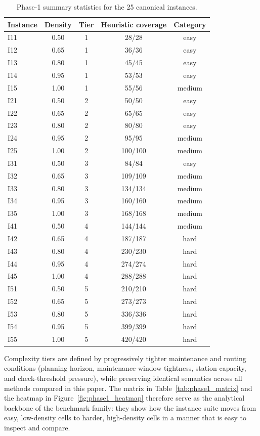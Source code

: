 \begin{table}[t]
\centering\small
\caption{Phase-1 summary statistics for the 25 canonical instances.}
\label{tab:phase1_summary}
\begin{tabular}{lcccc}
\toprule
Instance & Density & Tier & Heuristic coverage & Category \\
\midrule
I11 & 0.50 & 1 & 28/28 & easy \\
I12 & 0.65 & 1 & 36/36 & easy \\
I13 & 0.80 & 1 & 45/45 & easy \\
I14 & 0.95 & 1 & 53/53 & easy \\
I15 & 1.00 & 1 & 55/56 & medium \\
I21 & 0.50 & 2 & 50/50 & easy \\
I22 & 0.65 & 2 & 65/65 & easy \\
I23 & 0.80 & 2 & 80/80 & easy \\
I24 & 0.95 & 2 & 95/95 & medium \\
I25 & 1.00 & 2 & 100/100 & medium \\
I31 & 0.50 & 3 & 84/84 & easy \\
I32 & 0.65 & 3 & 109/109 & medium \\
I33 & 0.80 & 3 & 134/134 & medium \\
I34 & 0.95 & 3 & 160/160 & medium \\
I35 & 1.00 & 3 & 168/168 & medium \\
I41 & 0.50 & 4 & 144/144 & medium \\
I42 & 0.65 & 4 & 187/187 & hard \\
I43 & 0.80 & 4 & 230/230 & hard \\
I44 & 0.95 & 4 & 274/274 & hard \\
I45 & 1.00 & 4 & 288/288 & hard \\
I51 & 0.50 & 5 & 210/210 & hard \\
I52 & 0.65 & 5 & 273/273 & hard \\
I53 & 0.80 & 5 & 336/336 & hard \\
I54 & 0.95 & 5 & 399/399 & hard \\
I55 & 1.00 & 5 & 420/420 & hard \\
\bottomrule
\end{tabular}
\end{table}

Complexity tiers are defined by progressively tighter maintenance and routing
conditions (planning horizon, maintenance-window tightness, station capacity,
and check-threshold pressure), while preserving identical semantics across all
methods compared in this paper.  The matrix in Table~\ref{tab:phase1_matrix}
and the heatmap in Figure~\ref{fig:phase1_heatmap} therefore serve as the
analytical backbone of the benchmark family: they show how the instance suite
moves from easy, low-density cells to harder, high-density cells in a manner
that is easy to inspect and compare.

